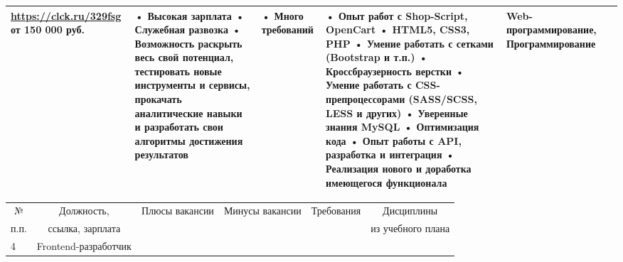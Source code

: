 \documentclass[14pt]{extreport}
\begin{document}
\begin{landscape}
\begin{table}[H]
\begin{center}
\begin{small}
\begin{tabular}{|p{0.1cm}|p{5cm}|p{4.5cm}|p{4.5cm}|p{4cm}|p{3cm}|}
				\url{https://clck.ru/329fsg}
				от 150 000 руб. &
				• Высокая зарплата
				\newline• Служебная развозка
				\newline• Возможность раскрыть весь свой потенциал, тестировать новые инструменты и сервисы, прокачать аналитические навыки и разработать свои алгоритмы достижения результатов
				&
				• Много требований
				&
				• Опыт работ с Shop-Script, OpenCart
				\newline• HTML5, CSS3, PHP
				\newline• Умение работать с сетками (Bootstrap и т.п.)
				\newline• Кроссбраузерность верстки
				\newline• Умение работать с CSS-препроцессорами (SASS/SCSS, LESS и других)
				\newline• Уверенные знания MySQL
				\newline• Оптимизация кода
				\newline• Опыт работы с API, разработка и интеграция
				\newline• Реализация нового и доработка имеющегося функционала
				&
				Web-программирование, Программирование
				\\ \hline
			\end{tabular}
		\end{small}
	\end{center}
\end{table}
\begin{table}[H]
	\begin{center}
		\begin{small}
		\begin{tabular}{|p{0.1cm}|p{5cm}|p{4.5cm}|p{4.5cm}|p{4cm}|p{3cm}|} \hline
			\multicolumn{1}{|c|}{№}&\multicolumn{1}{c|}{Должность,}&\multicolumn{1}{c|}{Плюсы вакансии}&\multicolumn{1}{c|}{Минусы вакансии}&\multicolumn{1}{c|}{Требования}&\multicolumn{1}{c|}{Дисциплины}\\ 
			\multicolumn{1}{|c|}{п.п.}&\multicolumn{1}{c|}{ссылка, зарплата}&\multicolumn{1}{c|}{}&\multicolumn{1}{c|}{}&\multicolumn{1}{c|}{}&\multicolumn{1}{c|}{из учебного плана}\\ 
			\hline
				4 & Frontend-разработчик
				

\end{tabular}
\end{small}
\end{center}
\end{table}
\end{landscape}
\end{document}
